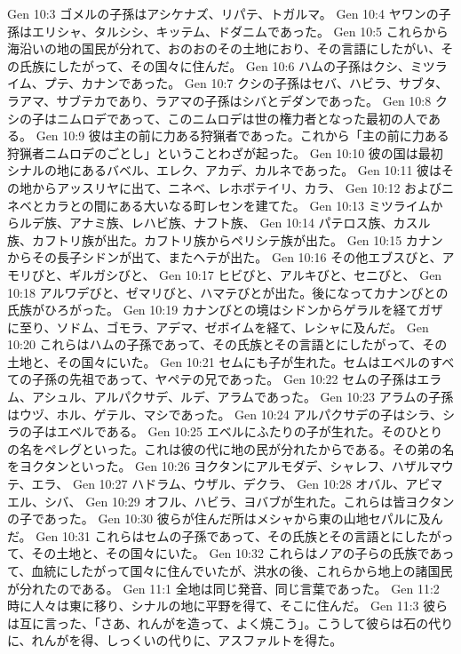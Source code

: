Gen 10:3  ゴメルの子孫はアシケナズ、リパテ、トガルマ。
Gen 10:4  ヤワンの子孫はエリシャ、タルシシ、キッテム、ドダニムであった。
Gen 10:5  これらから海沿いの地の国民が分れて、おのおのその土地におり、その言語にしたがい、その氏族にしたがって、その国々に住んだ。
Gen 10:6  ハムの子孫はクシ、ミツライム、プテ、カナンであった。
Gen 10:7  クシの子孫はセバ、ハビラ、サブタ、ラアマ、サブテカであり、ラアマの子孫はシバとデダンであった。
Gen 10:8  クシの子はニムロデであって、このニムロデは世の権力者となった最初の人である。
Gen 10:9  彼は主の前に力ある狩猟者であった。これから「主の前に力ある狩猟者ニムロデのごとし」ということわざが起った。
Gen 10:10  彼の国は最初シナルの地にあるバベル、エレク、アカデ、カルネであった。
Gen 10:11  彼はその地からアッスリヤに出て、ニネベ、レホボテイリ、カラ、
Gen 10:12  およびニネベとカラとの間にある大いなる町レセンを建てた。
Gen 10:13  ミツライムからルデ族、アナミ族、レハビ族、ナフト族、
Gen 10:14  パテロス族、カスル族、カフトリ族が出た。カフトリ族からペリシテ族が出た。
Gen 10:15  カナンからその長子シドンが出て、またヘテが出た。
Gen 10:16  その他エブスびと、アモリびと、ギルガシびと、
Gen 10:17  ヒビびと、アルキびと、セニびと、
Gen 10:18  アルワデびと、ゼマリびと、ハマテびとが出た。後になってカナンびとの氏族がひろがった。
Gen 10:19  カナンびとの境はシドンからゲラルを経てガザに至り、ソドム、ゴモラ、アデマ、ゼボイムを経て、レシャに及んだ。
Gen 10:20  これらはハムの子孫であって、その氏族とその言語とにしたがって、その土地と、その国々にいた。
Gen 10:21  セムにも子が生れた。セムはエベルのすべての子孫の先祖であって、ヤペテの兄であった。
Gen 10:22  セムの子孫はエラム、アシュル、アルパクサデ、ルデ、アラムであった。
Gen 10:23  アラムの子孫はウヅ、ホル、ゲテル、マシであった。
Gen 10:24  アルパクサデの子はシラ、シラの子はエベルである。
Gen 10:25  エベルにふたりの子が生れた。そのひとりの名をペレグといった。これは彼の代に地の民が分れたからである。その弟の名をヨクタンといった。
Gen 10:26  ヨクタンにアルモダデ、シャレフ、ハザルマウテ、エラ、
Gen 10:27  ハドラム、ウザル、デクラ、
Gen 10:28  オバル、アビマエル、シバ、
Gen 10:29  オフル、ハビラ、ヨバブが生れた。これらは皆ヨクタンの子であった。
Gen 10:30  彼らが住んだ所はメシャから東の山地セパルに及んだ。
Gen 10:31  これらはセムの子孫であって、その氏族とその言語とにしたがって、その土地と、その国々にいた。
Gen 10:32  これらはノアの子らの氏族であって、血統にしたがって国々に住んでいたが、洪水の後、これらから地上の諸国民が分れたのである。
Gen 11:1  全地は同じ発音、同じ言葉であった。
Gen 11:2  時に人々は東に移り、シナルの地に平野を得て、そこに住んだ。
Gen 11:3  彼らは互に言った、「さあ、れんがを造って、よく焼こう」。こうして彼らは石の代りに、れんがを得、しっくいの代りに、アスファルトを得た。
